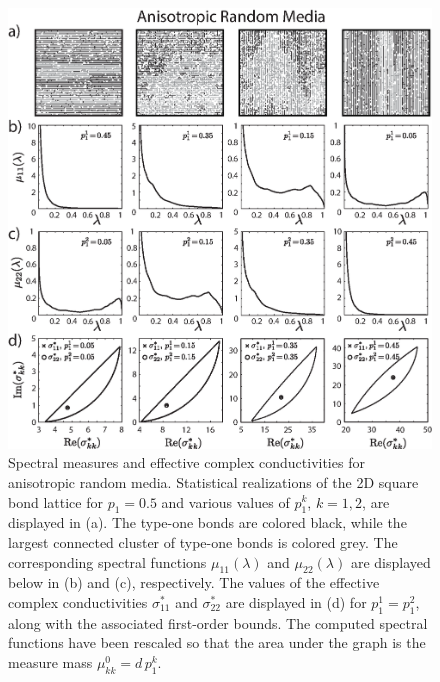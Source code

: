 \documentclass{cmslatex}
\begin{document}
%
\begin{figure}[t]
  \centerline{\includegraphics[scale=0.74]{Anisotropic_RRN_p=0_5.eps}} 
\caption{Spectral measures and effective complex conductivities for
  anisotropic random media. Statistical realizations of the 2D square
  bond lattice for $p_1=0.5$ and various values of $p_1^k$, $k=1,2$,
  are displayed in (a). The type-one bonds are colored black, while
  the largest connected cluster of type-one bonds is colored grey. The
  corresponding spectral functions $\mu_{11}(\lambda)$ and $\mu_{22}(\lambda)$ are
  displayed below in (b) and (c), respectively. The values of the
  effective complex conductivities $\sigma^*_{11}$ and $\sigma^*_{22}$ are
  displayed in (d) for $p_1^1=p_1^2$, along with the associated
  first-order bounds. The computed spectral functions have been
  rescaled so that the area under the graph is the measure mass
  $\mu^0_{kk}=d\,p_1^k$.    
        }
\label{fig:Anisotropic_Spectral_Measures}
\end{figure}
%
\end{document}
